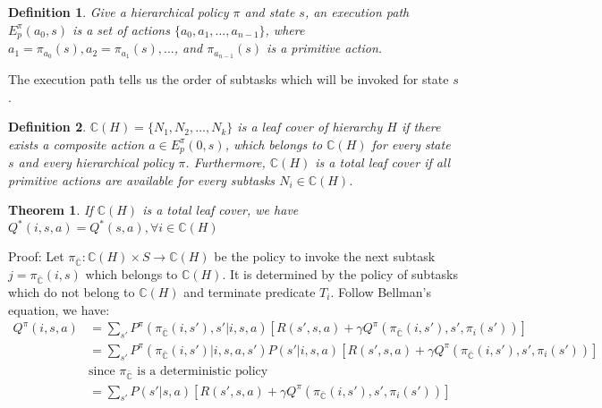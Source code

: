 \documentclass{article} %
\newtheorem{definition}{Definition}
\newtheorem{theorem}{Theorem}
\begin{document}
\begin{definition}
    Give a hierarchical policy $\pi$ and state $s$, an execution path $E_p^\pi(a_0, s)$ 
    is a set of actions $\{a_0, a_1, \dots, a_{n-1}\}$, where $a_1=\pi_{a_0}(s), a_2=\pi_{a_1}(s), \dots$,
    and $\pi_{a_{n-1}}(s)$ is a primitive action.
\end{definition}
The execution path tells us the order of subtasks which will be invoked for state $s$.


\begin{definition}
    $\mathbb{C}(H) = \{N_1, N_2, \dots, N_k\}$ is a leaf cover of hierarchy $H$ if 
    there exists a composite action $a \in E_p^{\pi}(0, s)$, which belongs to $\mathbb{C}(H)$ for every
    state $s$ and every hierarchical policy $\pi$.
    Furthermore, $\mathbb{C}(H)$ is a total leaf cover if all primitive actions are available for every 
    subtasks $N_i \in \mathbb{C}(H)$.
\end{definition}



\begin{theorem}
    If $\mathbb{C}(H)$ is a total leaf cover, we have $Q^*(i, s, a) = Q^*(s, a), \forall i \in \mathbb{C}(H)$
\end{theorem}
Proof: Let $\pi_{\bar{\mathbb{C}}}: \mathbb{C}(H) \times S \rightarrow \mathbb{C}(H)$ be the policy to invoke
the next subtask $j = \pi_{\bar{\mathbb{C}}}(i, s)$ which belongs to $\mathbb{C}(H)$. It is determined
by the policy of subtasks which do not belong to $\mathbb{C}(H)$ and terminate predicate $T_i$. Follow Bellman's equation, we have:
\begin{align}
    Q^{\pi}(i, s, a) &= \sum_{s'} P^{\pi}(\pi_{\bar{\mathbb{C}}}(i, s'), s'|i, s, a) [R(s', s, a) + \gamma Q^{\pi}(\pi_{\bar{\mathbb{C}}}(i, s'), s', \pi_i(s'))]\\
    &=\sum_{s'}P^{\pi}(\pi_{\bar{\mathbb{C}}}(i, s')| i, s, a, s') P(s' | i, s, a)  [R(s', s, a) + \gamma Q^{\pi}(\pi_{\bar{\mathbb{C}}}(i, s'), s', \pi_i(s'))]\\
    &\mbox{since $\pi_{\bar{\mathbb{C}}}$ is a deterministic policy}\\
    &=\sum_{s'} P(s' | s, a) [R(s', s, a) + \gamma Q^{\pi}(\pi_{\bar{\mathbb{C}}}(i, s'), s', \pi_i(s'))]
    \label{eq:MaxIrr}
\end{align}
\end{document}
